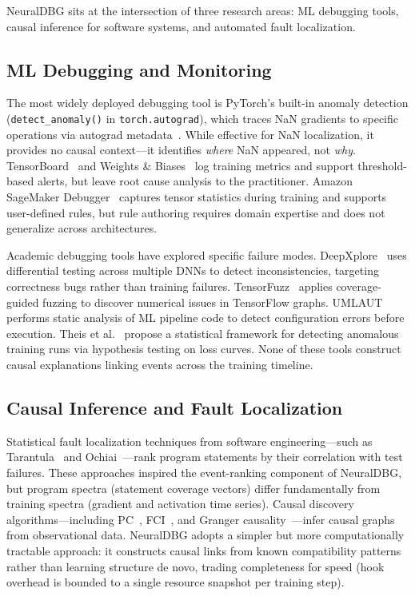 \documentclass[11pt]{article}
\begin{document}
NeuralDBG sits at the intersection of three research areas: ML debugging tools, causal inference for software systems, and automated fault localization.

\subsection{ML Debugging and Monitoring}

The most widely deployed debugging tool is PyTorch's built-in anomaly detection (\texttt{detect\_anomaly()} in \texttt{torch.autograd}), which traces NaN gradients to specific operations via autograd metadata~\cite{paszke2019pytorch}. While effective for NaN localization, it provides no causal context---it identifies \emph{where} NaN appeared, not \emph{why}. TensorBoard~\cite{abadi2016tensorflow} and Weights \& Biases~\cite{biewald2020wandb} log training metrics and support threshold-based alerts, but leave root cause analysis to the practitioner. Amazon SageMaker Debugger~\cite{nigenda2022sagemaker} captures tensor statistics during training and supports user-defined rules, but rule authoring requires domain expertise and does not generalize across architectures.

Academic debugging tools have explored specific failure modes. DeepXplore~\cite{pei2017deepxplore} uses differential testing across multiple DNNs to detect inconsistencies, targeting correctness bugs rather than training failures. TensorFuzz~\cite{odena2019tensorfuzz} applies coverage-guided fuzzing to discover numerical issues in TensorFlow graphs. UMLAUT~\cite{schoop2022umlaut} performs static analysis of ML pipeline code to detect configuration errors before execution. Theis et al.~\cite{theis2017detecting} propose a statistical framework for detecting anomalous training runs via hypothesis testing on loss curves. None of these tools construct causal explanations linking events across the training timeline.

\subsection{Causal Inference and Fault Localization}

Statistical fault localization techniques from software engineering---such as Tarantula~\cite{jones2005tarantula} and Ochiai~\cite{abreu2007ochiai}---rank program statements by their correlation with test failures. These approaches inspired the event-ranking component of NeuralDBG, but program spectra (statement coverage vectors) differ fundamentally from training spectra (gradient and activation time series). Causal discovery algorithms---including PC~\cite{spirtes2000causation}, FCI~\cite{zhang2008fci}, and Granger causality~\cite{granger1969causal}---infer causal graphs from observational data. NeuralDBG adopts a simpler but more computationally tractable approach: it constructs causal links from known compatibility patterns rather than learning structure de novo, trading completeness for speed (hook overhead is bounded to a single resource snapshot per training step).
\end{document}

